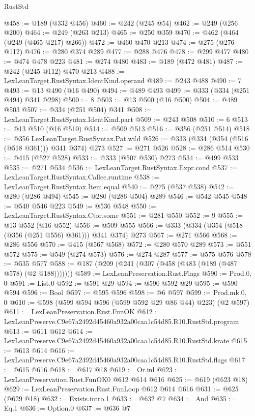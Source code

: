 \begin{lexlean}{RustStd}
\begin{coremodule}
@458 := @189 (@332 @456)
@460 := @242 (@245 @54)
@462 := @249 (@256 @200)
@464 := @249 (@263 @213)
@465 := @250 @359
@470 := @462 (@464 (@249 (@465 @217) @266))
@472 := @460 @470 @213
@474 := @275 (@276 @112)
@476 := @280 @374 @289
@477 := @288 @476
@478 := @299 @477
@480 := @474 @478 @223
@481 := @274 @480
@483 := @189 (@472 @481)
@487 := @242 (@245 @112) @470 @213
@488 := LexLeanTarget.RustSyntax.IdentKind.operand
@489 := @243 @488
@490 := 7
@493 := @13 @490 (@16 @490)
@494 := @489 @493
@499 := @333 (@334 (@251 @494) @341 @298)
@500 := 8
@503 := @13 @500 (@16 @500)
@504 := @489 @503
@507 := @334 (@251 @504) @341
@508 := LexLeanTarget.RustSyntax.IdentKind.part
@509 := @243 @508
@510 := 6
@513 := @13 @510 (@16 @510)
@514 := @509 @513
@516 := @356 (@251 @514)
@518 := @356 LexLeanTarget.RustSyntax.Pat.wild
@526 := @333 (@334 (@354 (@516 (@518 @361))) @341 @374) @273
@527 := @271 @526
@528 := @286 @514
@530 := @415 (@527 @528)
@533 := @333 (@507 @530) @273
@534 := @499 @533
@535 := @271 @534
@536 := LexLeanTarget.RustSyntax.Expr.cond
@537 := LexLeanTarget.RustSyntax.Callee.runtime
@538 := LexLeanTarget.RustSyntax.Item.equal
@540 := @275 (@537 @538)
@542 := @280 (@286 @494)
@545 := @280 (@286 @504) @289
@546 := @542 @545
@548 := @540 @546 @223
@549 := @536 @548
@550 := LexLeanTarget.RustSyntax.Ctor.some
@551 := @281 @550
@552 := 9
@555 := @13 @552 (@16 @552)
@556 := @509 @555
@566 := @333 (@334 (@354 (@518 (@356 (@251 @556) @361))) @341 @374) @273
@567 := @271 @566
@568 := @286 @556
@570 := @415 (@567 @568)
@572 := @280 @570 @289
@573 := @551 @572
@575 := @549 (@274 @573)
@576 := @274 @287
@577 := @575 @576
@578 := @535 @577
@588 := @187 (@209 (@241 (@307 (@458 (@483 (@189 (@487 @578) (@2 @188)))))))
@589 := LexLeanPreservation.Rust.Flags
@590 := Prod.{0, 0}
@591 := List.{0}
@592 := @591 @29
@594 := @590 @592 @29
@595 := @590 @594
@596 := Bool
@597 := @595 @596
@598 := @6 @597
@599 := Prod.mk.{0, 0}
@610 := @598 (@599 @594 @596 (@599 @592 @29 @86 @44) @223) (@2 @597)
@611 := LexLeanPreservation.Rust.FunOK
@612 := LexLeanPreserve.C9e67a2492d45460a932a00caa1c54d85.R10.RustStd.program
@613 := @611 @612
@614 := LexLeanPreserve.C9e67a2492d45460a932a00caa1c54d85.R10.RustStd.krate
@615 := @613 @614
@616 := LexLeanPreserve.C9e67a2492d45460a932a00caa1c54d85.R10.RustStd.flags
@617 := @615 @616
@618 := @617 @18
@619 := Or.inl
@623 := LexLeanPreservation.Rust.FunOK0 @612 @614 @616
@625 := @619 (@623 @18)
@629 := LexLeanPreservation.Rust.FunLoop @612 @614 @616
@631 := @625 (@629 @18)
@632 := Exists.intro.{1}
@633 := @632 @7
@634 := And
@635 := Eq.{1}
@636 := Option.{0}
@637 := @636 @7

\end{coremodule}
\end{lexlean}
